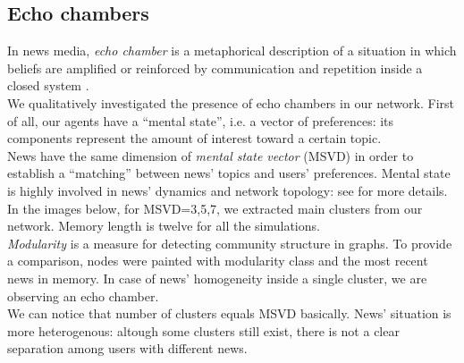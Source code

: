 \subsection{Echo chambers}
In news media, \textit{echo chamber} is a metaphorical description of a situation in which beliefs are amplified or reinforced by communication and repetition inside a closed system \cite{echochamwiki}\cite{echocham}.\\
We qualitatively investigated the presence of echo chambers in our network.
First of all, our agents have a ``mental  state'', i.e. a vector of preferences: its components represent the amount of interest toward a certain topic.\\
 News have the same dimension of \textit{mental state vector} (MSVD) in order to establish a ``matching'' between news' topics and users' preferences. 
 Mental state is highly involved in news' dynamics and network topology: see \cite{ourpaper} for more details.\\
 In the images below, for MSVD=3,5,7, we extracted main clusters from our network.
 Memory length is twelve for all the simulations.\\
 \textit{Modularity} is a measure for detecting community structure in graphs\cite{modulwiki}.
 To provide a comparison, nodes were painted with modularity class and the most recent news in memory.
 In case of news' homogeneity inside a single cluster, we are observing an echo chamber.\\
We can notice that number of clusters equals MSVD basically.
News' situation is more heterogenous: altough some clusters still exist, there is not a clear separation among users with different news. 
 
